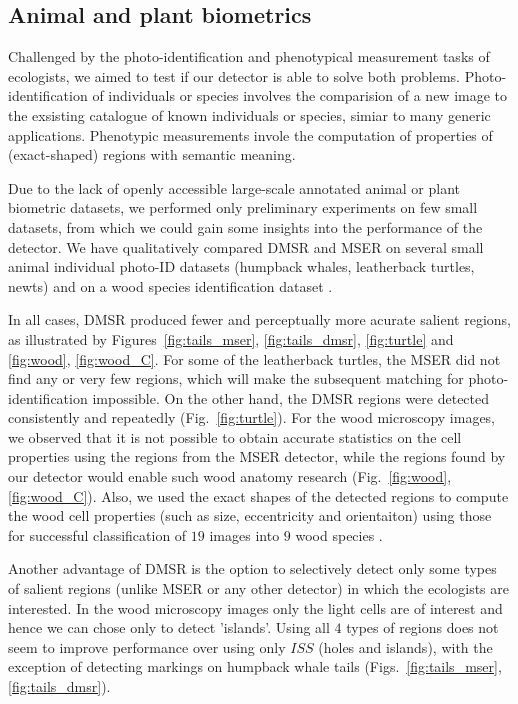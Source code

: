 \documentclass[conference,compsoc]{IEEEtran}
\begin{document}
\subsection{Animal and plant biometrics}
\label{ssec:bio}
Challenged by the photo-identification and phenotypical measurement tasks of ecologists, we aimed to test if our detector is able to solve both problems. Photo-identification of individuals or species involves the comparision of a new image to the exsisting catalogue of known individuals or species, simiar to many generic applications. Phenotypic measurements invole the computation of properties of (exact-shaped) regions with semantic meaning.

Due to the lack of openly accessible large-scale annotated animal or plant biometric datasets, we performed only preliminary experiments on few small datasets, from which we could gain some insights into the performance of the detector. We have qualitatively compared DMSR and MSER on several small animal individual photo-ID datasets (humpback whales, leatherback turtles, newts) and on a wood species identification dataset \cite{RangHumpb06, PauwelsZB08, wood}. 

In all cases, DMSR produced fewer and perceptually more acurate salient regions, as illustrated by Figures~\ref{fig:tails_mser}, \ref{fig:tails_dmsr}, \ref{fig:turtle} and \ref{fig:wood}, \ref{fig:wood_C}. For some of the leatherback turtles, the MSER did not find any or very few regions, which will make the subsequent matching for photo-identification impossible. On the other hand, the DMSR regions were detected consistently and repeatedly (Fig.~\ref{fig:turtle}). For the wood microscopy images, we observed that it is not possible to obtain accurate statistics on the cell properties using the regions from the MSER detector, while the regions found by our detector would enable such wood anatomy research (Fig.~\ref{fig:wood}, \ref{fig:wood_C}). Also, we used the exact shapes of the detected regions to compute the wood cell properties (such as size, eccentricity and orientaiton) using those for successful classification of $19$ images into $9$ wood species \cite{elena_ranguelova_wood}. 

Another advantage of DMSR is the option to selectively detect only some types of salient regions (unlike MSER or any other detector) in which the ecologists are interested. In the wood microscopy images only the light cells are of interest and hence we can chose only to detect 'islands'. Using all $4$ types of regions does not seem to improve performance over using only $ISS$ (holes and islands), with the exception of detecting markings on humpback whale tails (Figs.~\ref{fig:tails_mser}, \ref{fig:tails_dmsr}). 
\end{document}
